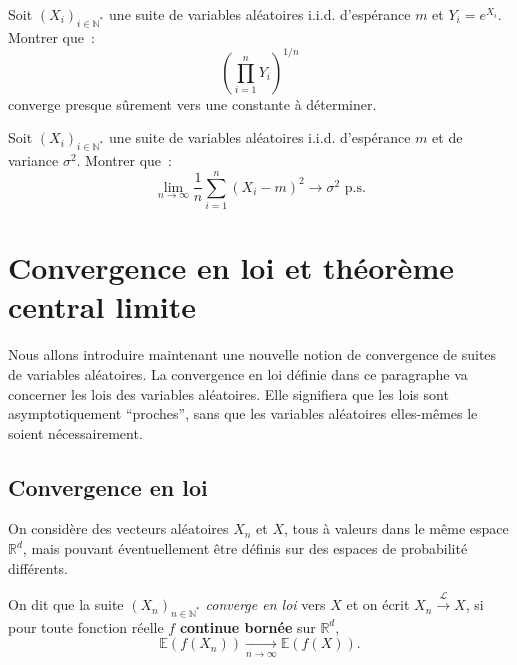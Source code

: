 \label{IV-expo}
Soit \((X_i)_{i \in \mathbb{N}^\ast}\) une suite de variables aléatoires
i.i.d. d'espérance \(m\) et \(Y_i = e^{X_i}\). Montrer que~:
\[\left(\prod_{i=1}^n Y_i\right)^{1/n}\] converge presque sûrement vers
une constante à déterminer.

\label{IV-variance}
Soit \((X_i)_{i \in \mathbb{N}^\ast}\) une suite de variables aléatoires
i.i.d. d'espérance \(m\) et de variance \(\sigma^2\). Montrer que~:
\[\lim_{n \to \infty} \frac{1}{n}\sum_{i=1}^n (X_i - m)^2 \to \sigma^2 \text{   p.s.}\]


\chapter{Convergence en loi et théorème central
limite}\label{IV-convergence-en-loi-et-thuxe9oruxe8me-central-limite-1}

Nous allons introduire maintenant une nouvelle notion de convergence de
suites de variables aléatoires. La convergence en loi définie dans ce
paragraphe va concerner les lois des variables aléatoires. Elle
signifiera que les lois sont asymptotiquement ``proches'', sans que les
variables aléatoires elles-mêmes le soient nécessairement.

\section{Convergence en loi}\label{IV-convergence-en-loi}

On considère des vecteurs aléatoires \(X_n\) et \(X\), tous à valeurs
dans le même espace \(\mathbb{R}^d\), mais pouvant éventuellement être
définis sur des espaces de probabilité différents.

\begin{definition}\label{IV-defconvloi}

On dit que la suite \((X_n)_{n\in \mathbb{N}^\ast}\) \emph{converge en
loi} vers \(X\) et on écrit \(X_n \xrightarrow{\mathcal{L}} X\), si pour
toute fonction réelle \(f\) \textbf{continue bornée} sur
\(\mathbb{R}^d\),
\[\mathbb{E}(f(X_n)) \xrightarrow[n \to \infty]{} \mathbb{E}(f(X)).\]
\end{definition}

